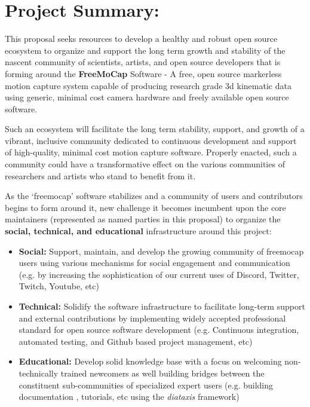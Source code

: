 \section{Project Summary:}

\noindent This proposal seeks resources to develop a healthy and robust open source ecosystem to organize and support the long term growth and stability of the nascent community of scientists, artists, and open source developers that is forming around the \textbf{FreeMoCap} Software - A free, open source markerless motion capture system capable of producing research grade 3d kinematic data using generic, minimal cost camera hardware and freely available open source software. 

 Such an ecosystem will facilitate the long term stability, support, and growth of a vibrant, inclusive community dedicated to continuous development and support of high-quality, minimal cost motion capture software. Properly enacted, such a community could have a transformative effect on the various communities of researchers and artists who stand to benefit from it.
 
As the `freemocap' software stabilizes and a community of users and contributors begins to form around it, new challenge it becomes incumbent upon the core maintainers (represented as named parties in this proposal) to organize the \textbf{social, technical, and educational} infrastructure around this project:

\begin{itemize}
    \item \textbf{Social:} Support, maintain, and develop the growing community of freemocap users using various mechanisms for social engagement and communication (e.g. by increasing the sophistication of our current uses of Discord, Twitter, Twitch, Youtube, etc)
    
    \item \textbf{Technical:} Solidify the software infrastructure to facilitate long-term support and external contributions by implementing widely accepted professional standard for open source software development (e.g. Continuous integration, automated testing, and Github based project management, etc)
    
    \item \textbf{Educational:} Develop solid knowledge base with a focus on welcoming non-technically trained newcomers as well building bridges between the constituent sub-communities of specialized expert users (e.g. building documentation , tutorials, etc using the \textit{diataxis} framework) 

\end{itemize}

